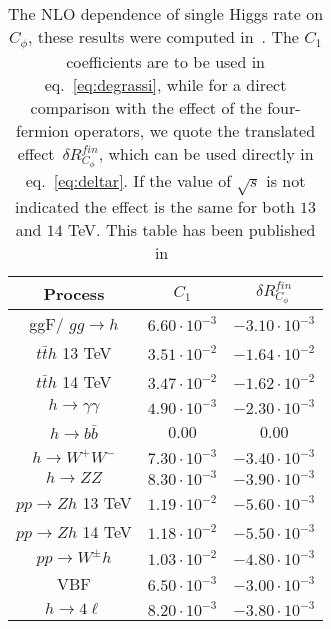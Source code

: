 
\begin{table}[h]
\centering
\begin{tabular}{ccc}
\toprule
Process&$C_1$ & $\delta R_{C_\phi}^{fin}$ \\
\midrule
ggF/ $gg\to h$  & $6.60\cdot 10^{-3}$ &  $-3.10\cdot 10^{-3}$ \\
$t\bar{t}h$   \textcolor{Mahogany}{13 TeV} & $3.51\cdot 10^{-2}$  &  $-1.64\cdot 10^{-2}$  \\
$t\bar{t}h$   \textcolor{Mahogany}{14 TeV} & $3.47\cdot 10^{-2}$  &  $-1.62\cdot 10^{-2}$ \\
$h\to \gamma \gamma$   & $4.90\cdot 10^{-3}$ &  $-2.30\cdot 10^{-3}$ \\
$h\to b\bar{b}$ & 0.00&0.00  \\
$h\to W^+ W^-$  & $7.30\cdot 10^{-3}$  & $-3.40\cdot 10^{-3}$ \\
$h\to Z Z$      & $8.30\cdot 10^{-3}$&  $-3.90\cdot 10^{-3}$ \\
$pp\to Zh$   \textcolor{Mahogany}{13 TeV}    & $1.19\cdot 10^{-2}$& $-5.60\cdot 10^{-3}$ \\
$pp\to Zh$    \textcolor{Mahogany}{14 TeV}    &$1.18\cdot 10^{-2}$&  $-5.50\cdot 10^{-3}$ \\
$pp\to W^\pm h$  & $1.03\cdot 10^{-2}$ &    $-4.80\cdot 10^{-3}$\\
VBF              & $6.50\cdot 10^{-3}$&   $-3.00\cdot 10^{-3}$ \\
$ h \to 4 \ell$       &     $8.20\cdot 10^{-3}$  &   $-3.80\cdot 10^{-3}$ \\
\bottomrule
\end{tabular}
\caption{The NLO dependence of single Higgs rate on $C_\phi$, these results were computed in~\cite{ Degrassi:2021uik}. The $C_1$ coefficients are to be used in eq.~\eqref{eq:degrassi}, while for a direct  comparison with the effect of the four-fermion operators, we quote the translated effect~$\delta R_{C_\phi}^{fin}$, which can be used directly in eq.~\eqref{eq:deltar}. If the value of $\sqrt{s}$ is not indicated the effect is the same for both $13$ and $14$ TeV. This table has been published in~\cite{Alasfar:2022zyr}
}
\label{table:resch}
\end{table}
